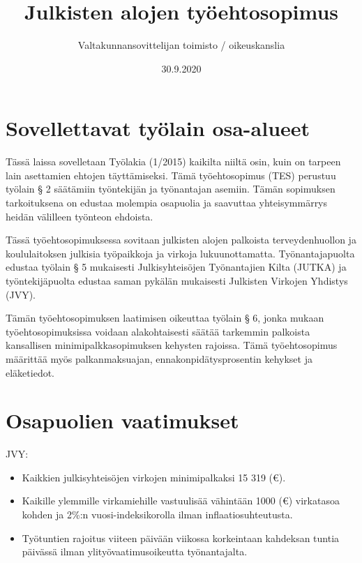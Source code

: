 \documentclass{article}
\title{Julkisten alojen työehtosopimus}
\author{Valtakunnansovittelijan toimisto / oikeuskanslia}
\date{30.9.2020}
\begin{document}
	
	\maketitle
	
	\newpage
	
	\section{Sovellettavat työlain osa-alueet}
	
	Tässä laissa sovelletaan Työlakia (1/2015) kaikilta niiltä osin, kuin on tarpeen lain asettamien ehtojen täyttämiseksi. Tämä työehtosopimus (TES) perustuu työlain § 2 säätämiin työntekijän ja työnantajan asemiin. Tämän sopimuksen tarkoituksena on edustaa molempia osapuolia ja saavuttaa yhteisymmärrys heidän välilleen työnteon ehdoista.
	
	\vspace{12pt}
	
	Tässä työehtosopimuksessa sovitaan julkisten alojen palkoista terveydenhuollon ja koululaitoksen julkisia työpaikkoja ja virkoja lukuunottamatta. Työnantajapuolta edustaa työlain § 5 mukaisesti Julkisyhteisöjen Työnantajien Kilta (JUTKA) ja työntekijäpuolta edustaa saman pykälän mukaisesti Julkisten Virkojen Yhdistys (JVY).
	
	\vspace{12pt}
	
	Tämän työehtosopimuksen laatimisen oikeuttaa työlain § 6, jonka mukaan työehtosopimuksissa voidaan alakohtaisesti säätää tarkemmin palkoista kansallisen minimipalkkasopimuksen kehysten rajoissa. Tämä työehtosopimus määrittää myös palkanmaksuajan, ennakonpidätysprosentin kehykset ja eläketiedot.
	
	\section{Osapuolien vaatimukset}
	
	JVY:
	\begin{itemize}
		\item Kaikkien julkisyhteisöjen virkojen minimipalkaksi 15 319 (€).
		\item Kaikille ylemmille virkamiehille vastuulisää vähintään 1000 (€) virkatasoa kohden ja 2\%:n vuosi-indeksikorolla ilman inflaatiosuhteutusta.
		\item Työtuntien rajoitus viiteen päivään viikossa korkeintaan kahdeksan tuntia päivässä ilman ylityövaatimusoikeutta työnantajalta.
	\end{itemize}
\end{document}
